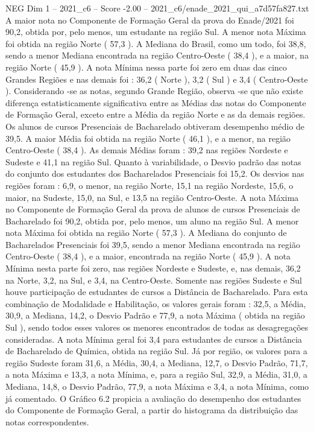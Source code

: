 \begin{textsample}{NEG Dim 1 – 2021\_c6 – Score -2.00 – 2021\_c6/enade\_2021\_qui\_a7d57fa827.txt}
A maior nota no Componente de Formação Geral da prova do Enade/2021 foi 90,2, obtida por, pelo menos, um estudante na região Sul.
A menor nota Máxima foi obtida na região Norte ( 57,3 ).
A Mediana do Brasil, como um todo, foi 38,8, sendo a menor Mediana encontrada na região Centro-Oeste ( 38,4 ), e a maior, na região Norte ( 45,9 ).
A nota Mínima nessa parte foi zero em duas das cinco Grandes Regiões e nas demais foi : 36,2 ( Norte ), 3,2 ( Sul ) e 3,4 ( Centro-Oeste ).
Considerando -se as notas, segundo Grande Região, observa -se que não existe diferença estatisticamente significativa entre as Médias das notas do Componente de Formação Geral, exceto entre a Média da região Norte e as da demais regiões.
Os alunos de cursos Presenciais de Bacharelado obtiveram desempenho médio de 39,5.
A maior Média foi obtida na região Norte ( 46,1 ), e a menor, na região Centro-Oeste ( 38,4 ).
As demais Médias foram : 39,2 nas regiões Nordeste e Sudeste e 41,1 na região Sul.
Quanto à variabilidade, o Desvio padrão das notas do conjunto dos estudantes dos Bacharelados Presenciais foi 15,2.
Os desvios nas regiões foram : 6,9, o menor, na região Norte, 15,1 na região Nordeste, 15,6, o maior, na Sudeste, 15,0, na Sul, e 13,5 na região Centro-Oeste.
A nota Máxima no Componente de Formação Geral da prova de alunos de cursos Presenciais de Bacharelado foi 90,2, obtida por, pelo menos, um aluno na região Sul.
A menor nota Máxima foi obtida na região Norte ( 57,3 ).
A Mediana do conjunto de Bacharelados Presenciais foi 39,5, sendo a menor Mediana encontrada na região Centro-Oeste ( 38,4 ), e a maior, encontrada na região Norte ( 45,9 ).
A nota Mínima nesta parte foi zero, nas regiões Nordeste e Sudeste, e, nas demais, 36,2 na Norte, 3,2, na Sul, e 3,4, na Centro-Oeste.
Somente nas regiões Sudeste e Sul houve participação de estudantes de cursos a Distância de Bacharelado.
Para esta combinação de Modalidade e Habilitação, os valores gerais foram : 32,5, a Média, 30,9, a Mediana, 14,2, o Desvio Padrão e 77,9, a nota Máxima ( obtida na região Sul ), sendo todos esses valores os menores encontrados de todas as desagregações consideradas.
A nota Mínima geral foi 3,4 para estudantes de cursos a Distância de Bacharelado de Química, obtida na região Sul.
Já por região, os valores para a região Sudeste foram 31,6, a Média, 30,4, a Mediana, 12,7, o Desvio Padrão, 71,7, a nota Máxima e 13,3, a nota Mínima, e, para a região Sul, 32,9, a Média, 31,0, a Mediana, 14,8, o Desvio Padrão, 77,9, a nota Máxima e 3,4, a nota Mínima, como já comentado.
O Gráfico 6.2 propicia a avaliação do desempenho dos estudantes do Componente de Formação Geral, a partir do histograma da distribuição das notas correspondentes.

\end{textsample}
